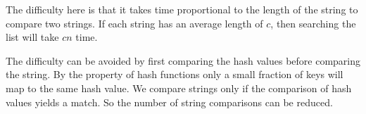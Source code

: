 The difficulty here is that it takes time proportional to the length 
of the string to compare two strings. If each string has an average
length of $c$, then searching the list will take $cn$ time.

The difficulty can be avoided by first comparing the hash values
before comparing the string. By the property of hash functions only a
small fraction of keys will map to the same hash value. We compare
strings only if the comparison of hash values yields a match. So the
number of string comparisons can be reduced.

